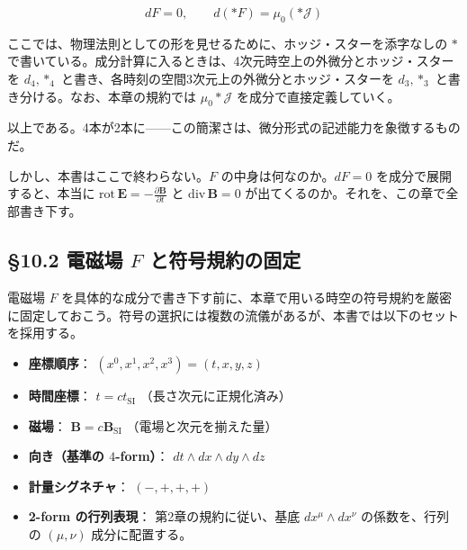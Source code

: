 \documentclass[a4paper,12pt,openany]{book}
\begin{document}
\[dF = 0, \qquad d(\ast F) = \mu_0(\ast\mathcal{J})\]

ここでは、物理法則としての形を見せるために、ホッジ・スターを添字なしの
\(\ast\)
で書いている。成分計算に入るときは、4次元時空上の外微分とホッジ・スターを
\(d_4,\ast_4\) と書き、各時刻の空間3次元上の外微分とホッジ・スターを
\(d_3,\ast_3\) と書き分ける。なお、本章の規約では
\(\mu_0\ast\mathcal{J}\) を成分で直接定義していく。

以上である。4本が2本に——この簡潔さは、微分形式の記述能力を象徴するものだ。

しかし、本書はここで終わらない。\(F\) の中身は何なのか。\(dF=0\)
を成分で展開すると、本当に
\(\mathrm{rot}\,\mathbf{E} = -\frac{\partial\mathbf{B}}{\partial t}\) と
\(\mathrm{div}\,\mathbf{B} = 0\)
が出てくるのか。それを、この章で全部書き下す。

\par\vspace{0.35em}\par

\hypertarget{ux96fbux78c1ux5834-f-ux3068ux7b26ux53f7ux898fux7d04ux306eux56faux5b9a}{%
\subsection{\texorpdfstring{§10.2 電磁場 \(F\)
と符号規約の固定}{§10.2 電磁場 F と符号規約の固定}}\label{ux96fbux78c1ux5834-f-ux3068ux7b26ux53f7ux898fux7d04ux306eux56faux5b9a}}

電磁場 \(F\)
を具体的な成分で書き下す前に、本章で用いる時空の符号規約を厳密に固定しておこう。符号の選択には複数の流儀があるが、本書では以下のセットを採用する。

\begin{itemize}
\item
  \textbf{座標順序}： \((x^0, x^1, x^2, x^3) = (t, x, y, z)\)
\item
  \textbf{時間座標}： \(t = ct_{\text{SI}}\) （長さ次元に正規化済み）
\item
  \textbf{磁場}： \(\mathbf{B} = c\mathbf{B}_{\text{SI}}\)
  （電場と次元を揃えた量）
\item
  \textbf{向き（基準の $4$-form）}：
  \(dt \wedge dx \wedge dy \wedge dz\)
\item
  \textbf{計量シグネチャ}： \((-, +, +, +)\)
\item
  \textbf{2-form の行列表現}： 第2章の規約に従い、基底
  \(dx^\mu \wedge dx^\nu\) の係数を、行列の \((\mu, \nu)\)
  成分に配置する。
\end{itemize}
\end{document}
